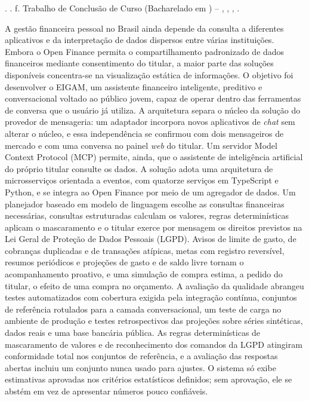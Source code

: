 \newpage
{}

\begingroup
{}
\setlength{\parindent}{0pt}

\authorsCitation{} \textbf{\workTitle}\ifdefempty{\workSubtitle}{}{: \workSubtitle}. \workYear. \pageref{LastPage} f. Trabalho de Conclusão de Curso (Bacharelado em \courseName) -- \centerName, \universityName, \workCity, \workYear.\par
\vspace{\baselineskip}

A gestão financeira pessoal no Brasil ainda depende da consulta a diferentes aplicativos e da interpretação de dados dispersos entre várias instituições. Embora o Open Finance permita o compartilhamento padronizado de dados financeiros mediante consentimento do titular, a maior parte das soluções disponíveis concentra-se na visualização estática de informações. O objetivo foi desenvolver o EIGAM, um assistente financeiro inteligente, preditivo e conversacional voltado ao público jovem, capaz de operar dentro das ferramentas de conversa que o usuário já utiliza. A arquitetura separa o núcleo da solução do provedor de mensageria: um adaptador incorpora novos aplicativos de \textit{chat} sem alterar o núcleo, e essa independência se confirmou com dois mensageiros de mercado e com uma conversa no painel \textit{web} do titular. Um servidor Model Context Protocol (MCP) permite, ainda, que o assistente de inteligência artificial do próprio titular consulte os dados. A solução adota uma arquitetura de microsserviços orientada a eventos, com quatorze serviços em TypeScript e Python, e se integra ao Open Finance por meio de um agregador de dados. Um planejador baseado em modelo de linguagem escolhe as consultas financeiras necessárias, consultas estruturadas calculam os valores, regras determinísticas aplicam o mascaramento e o titular exerce por mensagem os direitos previstos na Lei Geral de Proteção de Dados Pessoais (LGPD). Avisos de limite de gasto, de cobranças duplicadas e de transações atípicas, metas com registro reversível, resumos periódicos e projeções de gasto e de saldo livre tornam o acompanhamento proativo, e uma simulação de compra estima, a pedido do titular, o efeito de uma compra no orçamento. A avaliação da qualidade abrangeu testes automatizados com cobertura exigida pela integração contínua, conjuntos de referência rotulados para a camada conversacional, um teste de carga no ambiente de produção e testes retrospectivos das projeções sobre séries sintéticas, dados reais e uma base bancária pública. As regras determinísticas de mascaramento de valores e de reconhecimento dos comandos da LGPD atingiram conformidade total nos conjuntos de referência, e a avaliação das respostas abertas incluiu um conjunto nunca usado para ajustes. O sistema só exibe estimativas aprovadas nos critérios estatísticos definidos; sem aprovação, ele se abstém em vez de apresentar números pouco confiáveis.\par
\vspace{\baselineskip}

